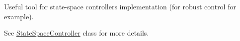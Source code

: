 Useful tool for state-\/space controllers implementation (for robust control for example).

See \hyperlink{classStateSpaceController}{State\+Space\+Controller} class for more details. 